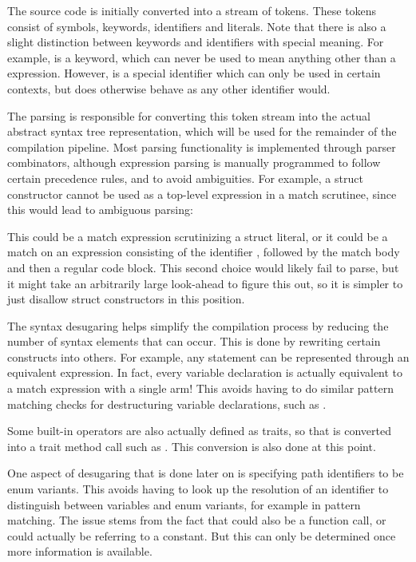 The source code is initially converted into a stream of tokens. These tokens consist of symbols, keywords, identifiers and literals. Note that there is also a slight distinction between keywords and identifiers with special meaning. For example,  is a keyword, which can never be used to mean anything other than a  expression. However,  is a special identifier which can only be used in certain contexts, but does otherwise behave as any other identifier would.
\par
The parsing is responsible for converting this token stream into the actual abstract syntax tree representation, which will be used for the remainder of the compilation pipeline. Most parsing functionality is implemented through parser combinators, although expression parsing is manually programmed to follow certain precedence rules, and to avoid ambiguities. For example, a struct constructor cannot be used as a top-level expression in a match scrutinee, since this would lead to ambiguous parsing: \par
{} \par
This could be a match expression scrutinizing a struct literal, or it could be a match on an expression consisting of the identifier , followed by the match body and then a regular code block. This second choice would likely fail to parse, but it might take an arbitrarily large look-ahead to figure this out, so it is simpler to just disallow struct constructors in this position. \par
The syntax desugaring helps simplify the compilation process by reducing the number of syntax elements that can occur. This is done by rewriting certain constructs into others. For example, any  statement can be represented through an equivalent  expression. In fact, every variable declaration is actually equivalent to a match expression with a single arm! This avoids having to do similar pattern matching checks for destructuring variable declarations, such as . \par
Some built-in operators are also actually defined as traits, so that  is converted into a trait method call such as . This conversion is also done at this point. \par
One aspect of desugaring that is done later on is specifying path identifiers to be enum variants. This avoids having to look up the resolution of an identifier to distinguish between variables and enum variants, for example in pattern matching. The issue stems from the fact that  could also be a function call, or  could actually be referring to a constant. But this can only be determined once more information is available.


